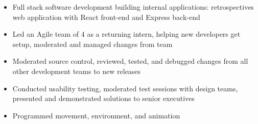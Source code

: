 \documentclass[10pt,a4paper,ragged2e,withhyper]{altacv}
\begin{document}
\begin{paracol}{2}
\divider

\begin{itemize}
    \item Full stack software development building internal applications: retrospectives web application with React front-end and Express back-end
    
    \item Led an Agile team of 4 as a returning intern, helping new developers get setup, moderated and managed changes from team
    
    \item Moderated source control, reviewed, tested, and debugged changes from all other development teams to new releases
    
    \item Conducted usability testing, moderated test sessions with design teams, presented and demonstrated solutions to senior executives
\end{itemize}

\divider




\begin{itemize}

\item Programmed movement, environment, and animation

\end{itemize}

\divider

\begin{itemize}


\end{itemize}
\end{paracol}
\end{document}
